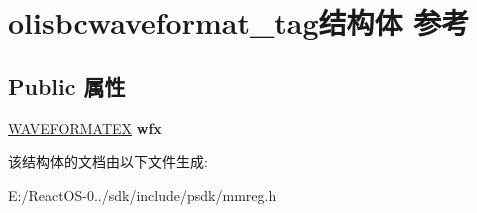 \hypertarget{structolisbcwaveformat__tag}{}\section{olisbcwaveformat\+\_\+tag结构体 参考}
\label{structolisbcwaveformat__tag}
\subsection*{Public 属性}
\begin{DoxyCompactItemize}
\item 
\mbox{\label{structolisbcwaveformat__tag_a2508cf8aa6f5be4f508b42e9d90200c0}} 
\hyperlink{struct_w_a_v_e_f_o_r_m_a_t_e_x}{W\+A\+V\+E\+F\+O\+R\+M\+A\+T\+EX} {\bfseries wfx}
\end{DoxyCompactItemize}


该结构体的文档由以下文件生成\+:\begin{DoxyCompactItemize}
\item 
E\+:/\+React\+O\+S-\/0../sdk/include/psdk/mmreg.\+h\end{DoxyCompactItemize}
